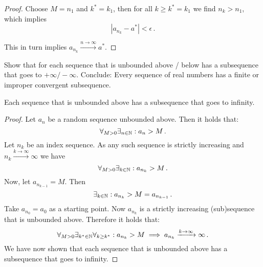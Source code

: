 \documentclass[week=4]{homework}
\begin{document}
\begin{questions}
\begin{proof}
        	Choose $M = n_1$ and $k^* = k_1$, then for all $k \geq k^* = k_1$ we find $n_k > n_1$, which implies
        	\[
	        	|a_{n_k} - a^*| < \epsilon\,.
        	\]
        	
        	This in turn implies $a_{n_k} \xrightarrow{n\to\infty} a^*$.
        \end{proof}
        
        \question 
        Show that for each sequence that is unbounded above / below has a subsequence that goes to $+ \infty / - \infty$. Conclude: Every sequence of real numbers has a finite or improper convergent subsequence. 
        
        \begin{inlinetoprove}
        	Each sequence that is unbounded above has a subsequence that goes to infinity.
        \end{inlinetoprove}
        \begin{proof}
        	Let $a_n$ be a random sequence unbounded above. Then it holds that:
        	\[
	        	\forall_{M > 0} \exists_{n \in \mathbb{N}} : a_n > M\,.
        	\]
	        Let $n_k$ be an index sequence. As any such sequence is strictly increasing and $n_k \xrightarrow{k\to\infty} \infty$ we have
	        \[
		        \forall_{M > 0} \exists_{k \in \mathbb{N}} : a_{n_{k}} > M\,.
	        \]
	        Now, let $a_{n_{k-1}} = M$. Then
	        \[
		        \exists_{k \in \mathbb{N}} : a_{n_{k}} > M = a_{n_{k-1}}\,.
	        \]
	        Take $a_{n_0} = a_0$ as a starting point. Now $a_{n_k}$ is a strictly increasing (sub)sequence that is unbounded above. Therefore it holds that:
	        \[
		        \forall_{M > 0} \exists_{k^* \in \mathbb{N}} \forall_{k \ge k^*} : a_{n_k} > M \implies a_{n_k} \xrightarrow{k \to \infty} \infty\,.
	        \]
	        We have now shown that each sequence that is unbounded above has a subsequence that goes to infinity.
        \end{proof}
        

\end{questions}
\end{document}

